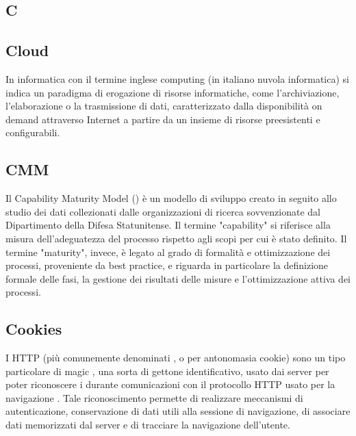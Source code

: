 \newpage

\begin{center}
\Huge\section*{\uppercase{C}}
\end{center}

\subsection*{Cloud}
In informatica con il termine inglese  computing (in italiano nuvola informatica) si indica un paradigma di erogazione di risorse informatiche, come l'archiviazione, l'elaborazione o la trasmissione di dati, caratterizzato dalla disponibilità on demand attraverso Internet a partire da un insieme di risorse preesistenti e configurabili.

\subsection*{CMM}
Il Capability Maturity Model () è un modello di sviluppo creato in seguito allo
studio dei dati collezionati dalle organizzazioni di ricerca sovvenzionate dal Dipartimento
della Difesa Statunitense. Il termine "capability" si riferisce alla misura dell'adeguatezza
del processo rispetto agli scopi per cui è stato definito. Il termine "maturity", invece, è
legato al grado di formalità e ottimizzazione dei processi, proveniente da best practice, e
riguarda in particolare la definizione formale delle fasi, la gestione dei risultati delle misure
e l'ottimizzazione attiva dei processi.

\subsection*{Cookies}
I  HTTP (più comunemente denominati  , o per antonomasia cookie) sono un tipo particolare di magic , una sorta di gettone identificativo, usato dai server  per poter riconoscere i  durante comunicazioni con il protocollo HTTP usato per la navigazione . Tale riconoscimento permette di realizzare meccanismi di autenticazione, conservazione di dati utili alla sessione di navigazione, di associare dati memorizzati dal server e di tracciare la navigazione dell'utente.

